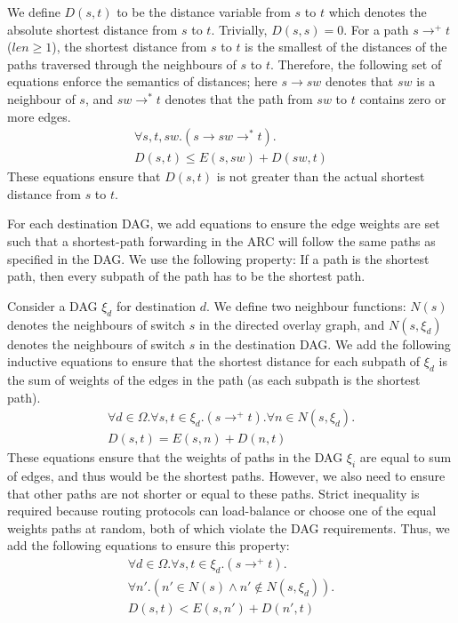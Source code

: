 We define $D(s,t)$ to be the distance variable from $s$ to $t$
which denotes the absolute shortest distance from $s$ to $t$. 
Trivially, $D(s,s) = 0$. For a path $s \rightarrow^+ t$ ($len \geq 1$),
the shortest distance from $s$ to $t$ is the smallest of the distances
of the paths traversed through the neighbours of $s$ to $t$. Therefore, the
following set of equations enforce the semantics of distances; 
here $s \rightarrow sw$ denotes that $sw$ is a neighbour
of $s$, and $sw \rightarrow^* t$ denotes that the path from $sw$ to $t$ contains
zero or more edges.
\begin{multline} \label{eq:dist}
\forall s, t, sw. (s \rightarrow sw \rightarrow^* t).\\
D(s, t) \leq E(s, sw) + D(sw, t)
\end{multline}
These equations ensure that $D(s,t)$ is not greater than 
the actual shortest distance from $s$ to $t$.

For each destination DAG, we add equations to ensure the 
edge weights are set such that a shortest-path forwarding in the ARC will 
follow the same paths as specified in the DAG. We use the following
property: If a path is the shortest 
path, then every subpath of the path has to be the shortest path.

Consider a DAG $\xi_d$ for destination $d$. We define two neighbour
functions: $N(s)$ denotes the neighbours of switch $s$ 
in the directed overlay graph, and $N(s, \xi_d)$ denotes
the neighbours of switch $s$ in the destination DAG. 
We add the following inductive equations to ensure that
 the shortest distance
for each subpath of $\xi_d$ is the sum of weights of the edges in the path (as
each subpath is the shortest path).
\begin{multline} \label{eq:shortest}
	\forall d \in \Omega. \forall s, t \in \xi_d. (s \rightarrow^+ t).
	\forall n \in N(s, \xi_d). \\
	 D(s,t) = E(s, n) + D(n, t)
\end{multline}
These equations ensure that the weights of paths in the DAG $\xi_i$ are equal to
sum of edges, and thus would be the shortest paths. 
However, we also need to ensure that other 
paths are not shorter or equal to these paths. 
Strict inequality is required because routing protocols
can load-balance or choose one of the equal weights paths at
random, both of which violate the DAG requirements.
Thus, we add the following equations to ensure this property:
\begin{multline} \label{eq:uniq}
		\forall d \in \Omega. \forall s, t \in \xi_d. (s \rightarrow^+ t).\\ 
		\forall n'. (n' \in N(s) \wedge n' \not\in N(s, \xi_d)). \\
		D(s,t) < E(s, n') + D(n', t)
\end{multline}

